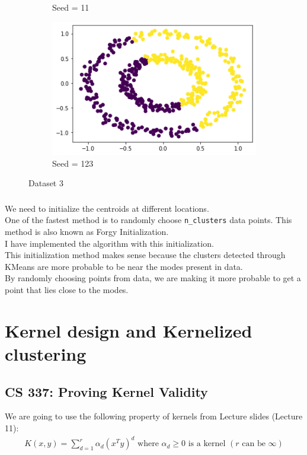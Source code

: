 \documentclass[12pt, fleqn]{article}
\begin{document}
\begin{figure}[H]
\begin{subfigure}[H]{0.35\textwidth}
        \caption[]{Seed = 11}
    \end{subfigure}
    \begin{subfigure}[H]{0.35\textwidth}
        \centering
        \includegraphics[width=\textwidth]{plots/D3/123.png}
        \caption[]{Seed = 123}
    \end{subfigure}
    \caption[]{Dataset 3}
\end{figure}

\subsubsection{}
We need to initialize the centroids at different locations. \\
One of the fastest method is to randomly choose \verb!n_clusters! data points. This method is also known as Forgy Initialization. \\
I have implemented the algorithm with this initialization. \\
This initialization method makes sense because the clusters detected through KMeans are more probable to be near the modes present in data. \\
By randomly choosing points from data, we are making it more probable to get a point that lies close to the modes.


\newpage
\section{Kernel design and Kernelized clustering}
\subsection{CS 337: Proving Kernel Validity}
We are going to use the following property of kernels from Lecture slides (Lecture 11):
\begin{equation*}
    \begin{aligned}
        K(x,y) = \sum_{d=1}^r \alpha_d(x^T y)^d \text{ where } \alpha_d \ge 0 \text{ is a kernel } (r \text{ can be } \infty)
    \end{aligned}
\end{equation*}
\end{document}
